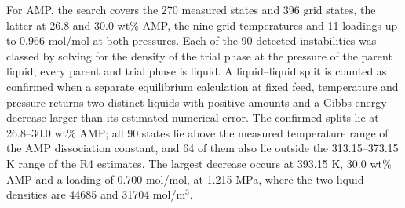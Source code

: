 For AMP, the search covers the 270 measured states and 396 grid states, the latter at 26.8 and 30.0 wt\% AMP, the nine grid temperatures and 11 loadings up to 0.966 mol/mol at both pressures.
Each of the 90 detected instabilities was classed by solving for the density of the trial phase at the pressure of the parent liquid; every parent and trial phase is liquid.
A liquid--liquid split is counted as confirmed when a separate equilibrium calculation at fixed feed, temperature and pressure returns two distinct liquids with positive amounts and a Gibbs-energy decrease larger than its estimated numerical error.
The confirmed splits lie at 26.8--30.0 wt\% AMP; all 90 states lie above the measured temperature range of the AMP dissociation constant, and 64 of them also lie outside the 313.15--373.15 K range of the R4 estimates.
The largest decrease occurs at 393.15 K, 30.0 wt\% AMP and a loading of 0.700 mol/mol, at 1.215 MPa, where the two liquid densities are 44685 and 31704 mol/m$^3$.
